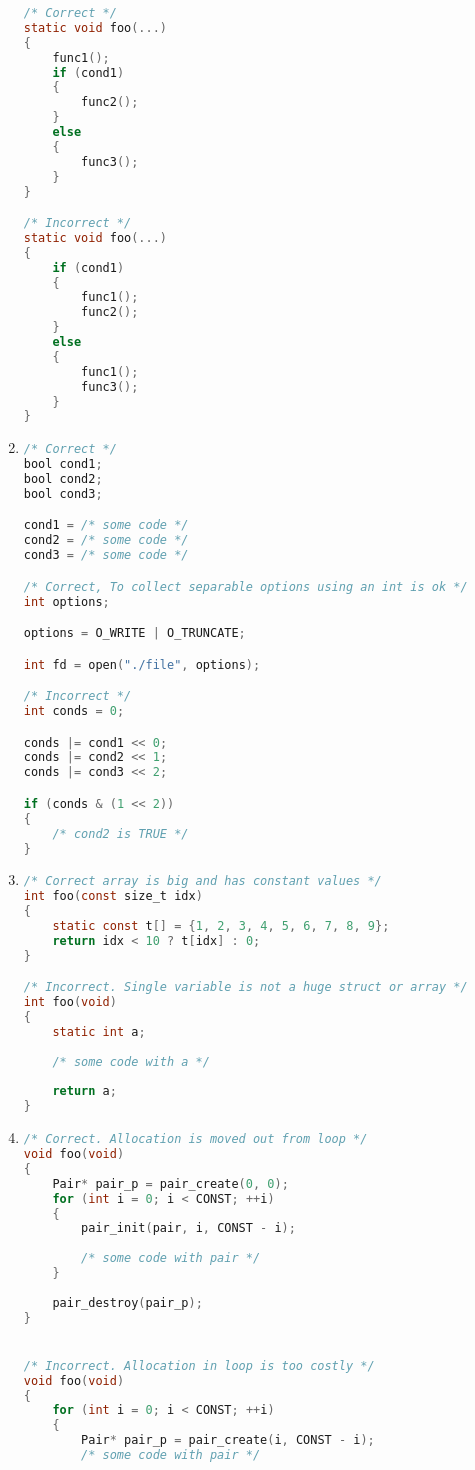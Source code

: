 \begin{enumerate}
\begin{lstlisting}[language=C,style=C99]
/* Correct */
static void foo(...)
{
    func1();
    if (cond1)
    {
        func2();
    }
    else
    {
        func3();
    }
}

/* Incorrect */
static void foo(...)
{
    if (cond1)
    {
        func1();
        func2();
    }
    else
    {
        func1();
        func3();
    }
}
\end{lstlisting}


    \item 
\begin{lstlisting}[language=C,style=C99]
/* Correct */
bool cond1;
bool cond2;
bool cond3;

cond1 = /* some code */
cond2 = /* some code */
cond3 = /* some code */

/* Correct, To collect separable options using an int is ok */
int options;

options = O_WRITE | O_TRUNCATE;

int fd = open("./file", options);

/* Incorrect */
int conds = 0;

conds |= cond1 << 0;
conds |= cond2 << 1;
conds |= cond3 << 2;

if (conds & (1 << 2))
{
    /* cond2 is TRUE */
}
\end{lstlisting}
    
    
    \item
\begin{lstlisting}[language=C,style=C99]
/* Correct array is big and has constant values */
int foo(const size_t idx)
{
    static const t[] = {1, 2, 3, 4, 5, 6, 7, 8, 9};
    return idx < 10 ? t[idx] : 0; 
}

/* Incorrect. Single variable is not a huge struct or array */
int foo(void)
{
    static int a;
    
    /* some code with a */
    
    return a;
}
\end{lstlisting}


    \item
\begin{lstlisting}[language=C,style=C99]
/* Correct. Allocation is moved out from loop */
void foo(void)
{
    Pair* pair_p = pair_create(0, 0);
    for (int i = 0; i < CONST; ++i)
    {
        pair_init(pair, i, CONST - i);
        
        /* some code with pair */
    }
    
    pair_destroy(pair_p);
}


/* Incorrect. Allocation in loop is too costly */
void foo(void)
{
    for (int i = 0; i < CONST; ++i)
    {
        Pair* pair_p = pair_create(i, CONST - i);
        /* some code with pair */
        

\end{lstlisting}
\end{enumerate}
